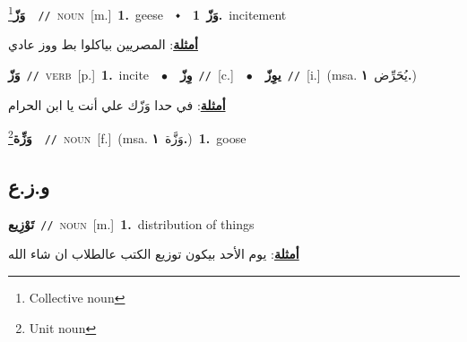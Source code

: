 \documentclass[10pt,a4paper,twoside]{article} %
\begin{document}
\begin{multicols}{2}
{\setlength\topsep{0pt}\textbf{\foreignlanguage{arabic}{وَزّ}}\footnote{Collective noun}\ \ {\color{gray}\texttt{//}\color{black}}\ \textsc{noun}\ [m.]\ \textbf{1.}~geese\ \ $\smblkdiamond$\ \ \setlength\topsep{0pt}\textbf{\foreignlanguage{arabic}{وَزّ}}\ \textbf{1.}~incitement\  \begin{flushright}\color{gray}\foreignlanguage{arabic}{\textbf{\underline{\foreignlanguage{arabic}{أمثلة}}}: المصريين بياكلوا بط ووز عادي}\end{flushright}\color{black}} \vspace{2mm}

{\setlength\topsep{0pt}\textbf{\foreignlanguage{arabic}{وَزّ}}\ {\color{gray}\texttt{//}\color{black}}\ \textsc{verb}\ [p.]\ \textbf{1.}~incite\ \ $\bullet$\ \ \setlength\topsep{0pt}\textbf{\foreignlanguage{arabic}{وِزّ}}\ {\color{gray}\texttt{//}\color{black}}\ [c.]\ \ $\bullet$\ \ \setlength\topsep{0pt}\textbf{\foreignlanguage{arabic}{يوِزّ}}\ {\color{gray}\texttt{//}\color{black}}\ [i.]\ \color{gray}(msa. \foreignlanguage{arabic}{يُحَرِّض}~\foreignlanguage{arabic}{\textbf{١.}})\color{black}\  \begin{flushright}\color{gray}\foreignlanguage{arabic}{\textbf{\underline{\foreignlanguage{arabic}{أمثلة}}}: في حدا وَزّك علي أنت يا ابن الحرام}\end{flushright}\color{black}} \vspace{2mm}

{\setlength\topsep{0pt}\textbf{\foreignlanguage{arabic}{وَزِّة}}\footnote{Unit noun}\ \ {\color{gray}\texttt{//}\color{black}}\ \textsc{noun}\ [f.]\ \color{gray}(msa. \foreignlanguage{arabic}{وَزَّة}~\foreignlanguage{arabic}{\textbf{١.}})\color{black}\ \textbf{1.}~goose\ } \vspace{2mm}

\vspace{-3mm}
\subsection*{\color{blue}\foreignlanguage{arabic}{و.ز.ع}\color{blue}{}} 

{\setlength\topsep{0pt}\textbf{\foreignlanguage{arabic}{تَوْزِيع}}\ {\color{gray}\texttt{//}\color{black}}\ \textsc{noun}\ [m.]\ \textbf{1.}~distribution of things\  \begin{flushright}\color{gray}\foreignlanguage{arabic}{\textbf{\underline{\foreignlanguage{arabic}{أمثلة}}}: يوم الأحد بيكون توزيع الكتب عالطلاب ان شاء الله}\end{flushright}\color{black}} \vspace{2mm}


\end{multicols}
\end{document}
